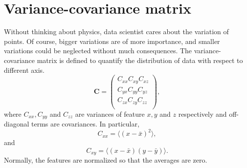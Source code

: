 \section{Variance-covariance matrix}
Without thinking about physics, data scientist cares about the variation of points. Of course, bigger variations are of more importance, and smaller variations could be neglected without much consequences. The variance-covariance matrix is defined to quantify the distribution of data with respect to different axis.
\begin{equation}
	\mathbf{C} = \begin{pmatrix}
			C_{xx} C_{xy} C_{xz}\\
			C_{yx} C_{yy} C_{yz}\\
			C_{zx} C_{zy} C_{zz}\\
		     \end{pmatrix},
\end{equation}
where $C_{xx}, C_{yy}$ and $C_{zz}$ are variances of feature $x, y$ and $z$ respectively and off-diagonal terms are covariances. In particular,
\begin{equation}
C_{xx} = \langle (x-\bar x)^2\rangle,	
\end{equation}
and
\begin{equation}
C_{xy} = \langle(x-\bar x)(y-\bar y)\rangle.
\end{equation}
Normally, the features are normalized so that the averages are zero.
